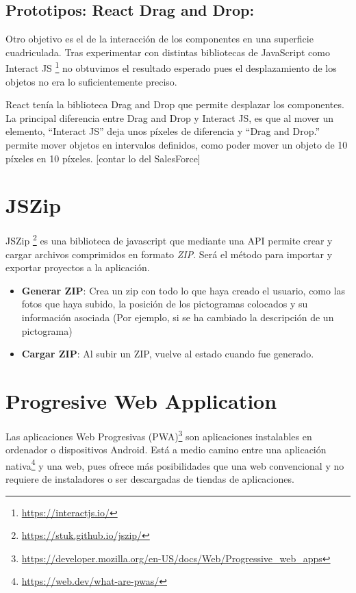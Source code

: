 \subsection{Prototipos: React Drag and Drop:}

Otro objetivo es el de la interacción de los componentes en una superficie cuadriculada. Tras experimentar con distintas bibliotecas de JavaScript como Interact JS \footnote{\url{https://interactjs.io/}} no obtuvimos el resultado esperado pues el desplazamiento de los objetos no era lo suficientemente preciso.

React tenía la biblioteca Drag and Drop que permite desplazar los componentes. La principal diferencia entre Drag and Drop y Interact JS, es que al mover un elemento, “Interact JS”  deja unos píxeles de diferencia y “Drag and Drop.” permite mover objetos en intervalos definidos, como poder mover un objeto de 10 píxeles en 10 píxeles. [contar lo del SalesForce]

\section{JSZip}

JSZip \footnote{\url{https://stuk.github.io/jszip/}} es una biblioteca de javascript que mediante una API permite crear y cargar archivos comprimidos en formato \textit{ZIP}. Será el método para importar y exportar proyectos a la aplicación.
\begin{itemize}
	\item \textbf{Generar ZIP}: Crea un zip con todo lo que haya creado el usuario, como las fotos que haya subido, la posición de los pictogramas colocados y su información asociada (Por ejemplo, si se ha cambiado la descripción de un pictograma)
	\item \textbf{Cargar ZIP}: Al subir un ZIP, vuelve al estado cuando fue generado.
\end{itemize}	


\section{Progresive Web Application}


Las aplicaciones Web Progresivas (PWA)\footnote{\url{https://developer.mozilla.org/en-US/docs/Web/Progressive_web_apps}} son aplicaciones instalables en ordenador o dispositivos Android. Está a medio camino entre una aplicación nativa\footnote{\url{https://web.dev/what-are-pwas/}}  y una web, pues ofrece más posibilidades que una web convencional y no requiere de instaladores o ser descargadas de tiendas de aplicaciones.
    
